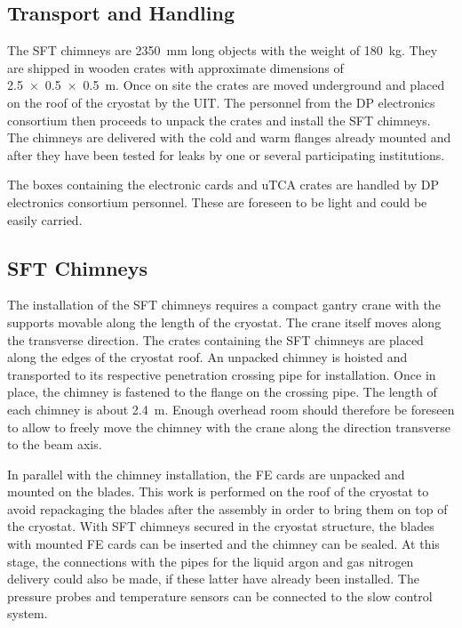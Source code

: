 \subsection{Transport and Handling}
\label{sec:fddp-tpc-elec-install-transport}

The SFT chimneys are \SI{2350}{\mm} long objects with the weight of \SI{180}{\kg}. They are shipped in wooden crates with approximate dimensions of \SI[product-units=power]{2.5x0.5x0.5}{m}. Once on site the crates are moved underground and placed on the roof of the cryostat by the UIT. The personnel from the DP electronics consortium then proceeds to unpack the crates and install the SFT chimneys. The chimneys are delivered with the cold and warm flanges already mounted and after they have been tested for leaks by one or several participating institutions.  

The boxes containing the electronic cards and uTCA crates are handled by DP electronics consortium personnel. These are foreseen to be light and could be easily carried. 

\subsection{SFT Chimneys}
\label{sec:fddp-tpc-elec-install-sft}

The installation of the SFT chimneys requires a compact gantry crane with the supports movable along the length of the cryostat. The crane itself moves along the transverse direction. The crates containing the SFT chimneys are placed along the edges of the cryostat roof. An unpacked chimney is hoisted and transported to its respective penetration crossing pipe for installation. Once in place, the chimney is fastened to the flange on the crossing pipe. The length of each chimney is about \SI{2.4}{m}. Enough overhead room should therefore be foreseen to allow to freely move the chimney with the crane along the direction transverse to the beam axis. 

In parallel with the chimney installation, the FE cards are unpacked and mounted on the blades. This work is performed on the roof of the cryostat to avoid repackaging the blades after the assembly in order to bring them on top of the cryostat. With SFT chimneys secured in the cryostat structure, the blades with mounted FE cards can be inserted and the chimney can be sealed. At this stage, the connections with the pipes for the liquid argon and gas nitrogen delivery could also be made, if these latter have already been installed. The pressure probes and temperature sensors can be connected to the slow control system.
 
